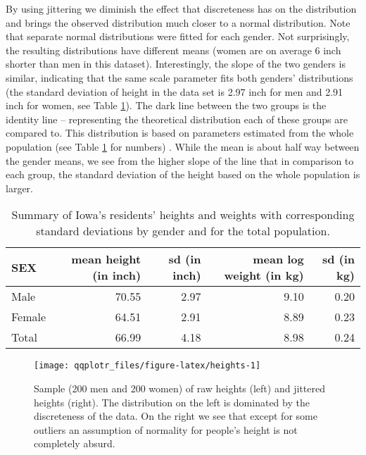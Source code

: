 By using jittering we diminish the effect that discreteness has on the
distribution and brings the observed distribution much closer to a
normal distribution. Note that separate normal distributions were fitted
for each gender. Not surprisingly, the resulting distributions have
different means (women are on average 6 inch shorter than men in this
dataset). Interestingly, the slope of the two genders is similar,
indicating that the same scale parameter fits both genders'
distributions (the standard deviation of height in the data set is 2.97
inch for men and 2.91 inch for women, see Table \ref{tab:heights}). The
dark line between the two groups is the identity line -- representing
the theoretical distribution each of these groups are compared to. This
distribution is based on parameters estimated from the whole population
(see Table \ref{tab:heights} for numbers) . While the mean is about half
way between the gender means, we see from the higher slope of the line
that in comparison to each group, the standard deviation of the height
based on the whole population is larger.

\begin{table}

\caption{\label{tab:heights-table}Summary of Iowa's residents' heights and weights with corresponding standard deviations by gender and for the total population.\label{tab:heights}}
\centering
\begin{tabular}[t]{lrrrr}
\toprule
SEX & mean height (in inch) & sd (in inch) & mean log weight (in kg) & sd (in kg)\\
\midrule
Male & 70.55 & 2.97 & 9.10 & 0.20\\
Female & 64.51 & 2.91 & 8.89 & 0.23\\
Total & 66.99 & 4.18 & 8.98 & 0.24\\
\bottomrule
\end{tabular}
\end{table}

\begin{Schunk}
\begin{figure}

{\centering \texttt{[image: qqplotr\_files/figure-latex/heights-1]} 

}

\caption[Sample (200 men and 200 women) of raw heights (left) and jittered heights (right)]{Sample (200 men and 200 women) of raw heights (left) and jittered heights (right). The distribution on the left is dominated by the discreteness of the data. On the right we see that except for some outliers an assumption of normality for people's height is not completely absurd.}\label{fig:heights}
\end{figure}
\end{Schunk}

